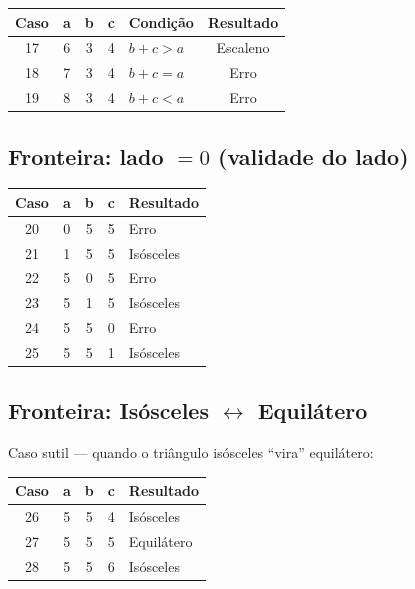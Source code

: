 \documentclass[12pt,a4paper]{article}
\begin{document}
\begin{center}
\begin{tabular}{cccclc}
\toprule
\textbf{Caso} & \textbf{a} & \textbf{b} & \textbf{c} & \textbf{Condição} & \textbf{Resultado} \\
\midrule
17 & 6 & 3 & 4 & $b + c > a$ & Escaleno \\
18 & 7 & 3 & 4 & $b + c = a$ & Erro \\
19 & 8 & 3 & 4 & $b + c < a$ & Erro \\
\bottomrule
\end{tabular}
\end{center}

\subsection{Fronteira: lado $= 0$ (validade do lado)}

\begin{center}
\begin{tabular}{ccccl}
\toprule
\textbf{Caso} & \textbf{a} & \textbf{b} & \textbf{c} & \textbf{Resultado} \\
\midrule
20 & 0 & 5 & 5 & Erro \\
21 & 1 & 5 & 5 & Isósceles \\
22 & 5 & 0 & 5 & Erro \\
23 & 5 & 1 & 5 & Isósceles \\
24 & 5 & 5 & 0 & Erro \\
25 & 5 & 5 & 1 & Isósceles \\
\bottomrule
\end{tabular}
\end{center}

\subsection{Fronteira: Isósceles $\leftrightarrow$ Equilátero}

Caso sutil --- quando o triângulo isósceles ``vira'' equilátero:

\begin{center}
\begin{tabular}{ccccl}
\toprule
\textbf{Caso} & \textbf{a} & \textbf{b} & \textbf{c} & \textbf{Resultado} \\
\midrule
26 & 5 & 5 & 4 & Isósceles \\
27 & 5 & 5 & 5 & Equilátero \\
28 & 5 & 5 & 6 & Isósceles \\
\bottomrule
\end{tabular}
\end{center}
\end{document}
